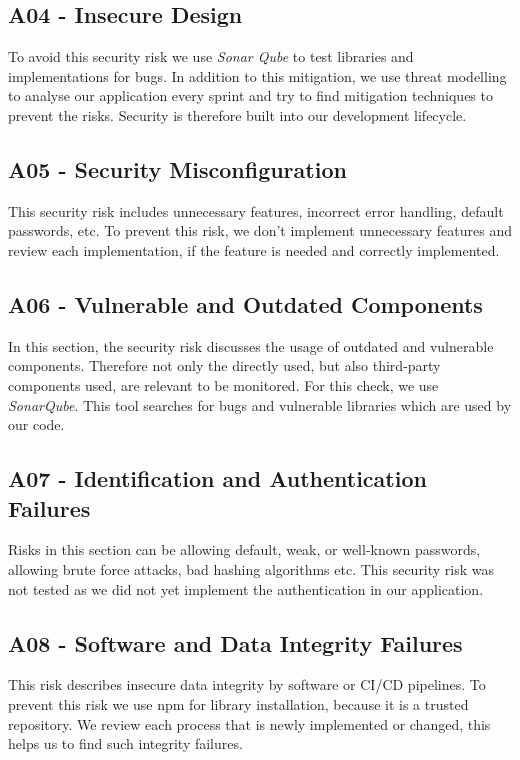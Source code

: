 \subsection{A04 - Insecure Design}
To avoid this security risk we use \textit{Sonar Qube} to test libraries and implementations for bugs. In addition to this mitigation, we use threat modelling to analyse our application every sprint and try to find mitigation techniques to prevent the risks. Security is therefore built into our development lifecycle.

\subsection{A05 - Security Misconfiguration}
This security risk includes unnecessary features, incorrect error handling, default passwords, etc.
To prevent this risk, we don't implement unnecessary features and review each implementation, if the feature is needed and correctly implemented.

\subsection{A06 - Vulnerable and Outdated Components}
In this section, the security risk discusses the usage of outdated and vulnerable components. Therefore not only the directly used, but also third-party components used, are relevant to be monitored. For this check, we use \textit{SonarQube}. This tool searches for bugs and vulnerable libraries which are used by our code.

\subsection{A07 - Identification and Authentication Failures}
Risks in this section can be allowing default, weak, or well-known passwords, allowing brute force attacks, bad hashing algorithms etc.
This security risk was not tested as we did not yet implement the authentication in our application.

\subsection{A08 - Software and Data Integrity Failures}
This risk describes insecure data integrity by software or CI/CD pipelines.
To prevent this risk we use npm for library installation, because it is a trusted repository. We review each process that is newly implemented or changed, this helps us to find such integrity failures.

